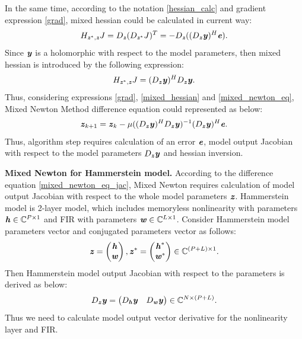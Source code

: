 \documentclass[12pt]{article}
\newcommand{\bit}[1]{\ensuremath{\textbf{\textit{#1}}}}
\begin{document}
In the same time, according to the notation \eqref{hessian_calc} and gradient expression \eqref{grad}, mixed hessian could be calculated in current way:
\begin{equation}
    H_{\bit{z}^*, \bit{z}}J=D_{\bit{z}}(D_{\bit{z}^*}J)^T=-D_{\bit{z}}((D_{\bit{z}}\bit{y})^H\bit{e}).
\end{equation}
Since \bit{y} is a holomorphic with respect to the model parameters, then mixed hessian is introduced by the following expression:
\begin{equation}
    H_{\bit{z}^*, \bit{z}}J=(D_{\bit{z}}\bit{y})^HD_{\bit{z}}\bit{y}.
    \label{mixed_hessian}
\end{equation}
Thus, considering expressions \eqref{grad}, \eqref{mixed_hessian} and \eqref{mixed_newton_eq}, Mixed Newton Method difference equation could represented as below:
\begin{equation}
    \bit{z}_{k+1}=\bit{z}_k-\mu ((D_{\bit{z}}\bit{y})^HD_{\bit{z}}\bit{y})^{-1}(D_{\bit{z}}\bit{y})^H\bit{e}.
    \label{mixed_newton_eq_jac}
\end{equation}
Thus, algorithm step requires calculation of an error \bit{e}, model output Jacobian with respect to the model parameters $D_{\bit{z}}\bit{y}$ and hessian inversion.

\textbf{Mixed Newton for Hammerstein model.} \label{mnm_for_hammer}
According to the difference equation \eqref{mixed_newton_eq_jac}, Mixed Newton requires calculation of model output Jacobian with respect to the whole model parameters \bit{z}. Hammerstein model is 2-layer model, which includes memoryless nonlinearity with parameters $\bit{h}\in\mathbb{C}^{P\times 1}$ and FIR with parameters $\bit{w}\in\mathbb{C}^{L\times 1}$. Consider Hammerstein model parameters vector and conjugated parameters vector as follows:
\begin{equation}
    \bit{z}=\begin{pmatrix}
        \bit{h} \\ \bit{w}
    \end{pmatrix},
    \bit{z}^*=\begin{pmatrix}
        \bit{h}^* \\ \bit{w}^*
    \end{pmatrix}
    \in\mathbb{C}^{(P+L)\times 1}.
\end{equation}
Then Hammerstein model output Jacobian with respect to the parameters is derived as below:
\begin{equation}
    D_{\bit{z}}\bit{y}=\begin{pmatrix}
        D_{\bit{h}}\bit{y} & D_{\bit{w}}\bit{y}
    \end{pmatrix}
    \in\mathbb{C}^{N\times(P+L)}.
    \label{jacobian_full}
\end{equation}
Thus we need to calculate model output vector derivative for the nonlinearity layer and FIR.
\end{document}
